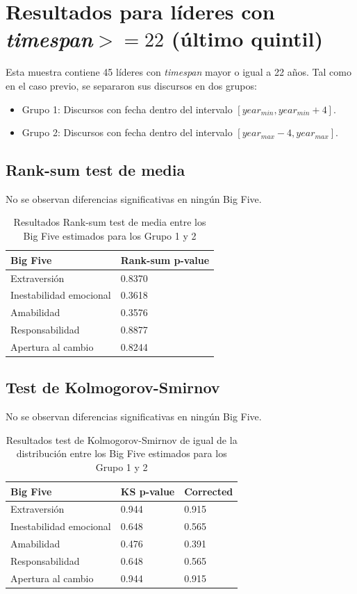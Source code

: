 \documentclass[12pt]{article}%
\begin{document}
\section{Resultados para líderes con \textit{timespan}$>=22$ (último quintil)}

Esta muestra contiene 45 líderes con \textit{timespan} mayor o igual a 22 años. Tal como en el caso previo, se separaron sus discursos en dos grupos:
\begin{itemize}
	\item Grupo 1: Discursos con fecha dentro del intervalo $[year_{min},year_{min}+4].$
	\item Grupo 2: Discursos con fecha dentro del intervalo $[year_{max}-4,year_{max}].$
\end{itemize}


\subsection{Rank-sum test de media}
No se observan diferencias significativas en ningún Big Five.
\begin{table}[htpb]
	\centering
	\caption{Resultados Rank-sum test de media entre los Big Five estimados para los Grupo 1 y 2}
	\label{my-label}
	\begin{tabular}{ll}
		\toprule\toprule
		Big Five                & Rank-sum p-value \\
		\midrule
		Extraversión            & 0.8370           \\
		Inestabilidad emocional & 0.3618           \\
		Amabilidad              & 0.3576          \\
		Responsabilidad         & 0.8877           \\
		Apertura al cambio      & 0.8244   \\
		\bottomrule \bottomrule   
	\end{tabular}
\end{table}

\subsection{Test de Kolmogorov-Smirnov}
No se observan diferencias significativas en ningún Big Five.
\begin{table}[htpb]
	\centering
	\caption{Resultados test de Kolmogorov-Smirnov de igual de la distribución entre los Big Five estimados para los Grupo 1 y 2}
	\label{my-label}
	\begin{tabular}{lll}
		\toprule\toprule
		Big Five                & KS p-value & Corrected\\
		\midrule
		Extraversión            &  0.944   &  0.915          \\
		Inestabilidad emocional & 0.648   &   0.565         \\
		Amabilidad              & 0.476   &   0.391           \\
		Responsabilidad         & 0.648   &   0.565        \\
		Apertura al cambio      & 0.944   &  0.915   \\
		\bottomrule \bottomrule   
	\end{tabular}
\end{table}
\end{document}
